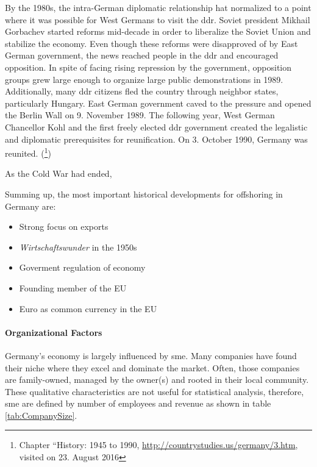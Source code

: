 By the 1980s, the intra-German diplomatic relationship hat normalized to a point where it was possible for West Germans to visit the \gls{ddr}. Soviet president Mikhail Gorbachev started reforms  mid-decade in order to liberalize the Soviet Union and stabilize the economy. Even though these reforms were disapproved of by East German government, the news reached people in the \gls{ddr} and encouraged opposition. In spite of facing rising repression by the government, opposition groups grew large enough to organize large public demonstrations in 1989. Additionally, many \gls{ddr} citizens fled the country through neighbor states, particularly Hungary. East German government caved to the pressure and opened the Berlin Wall on 9. November 1989. The following year, West German Chancellor Kohl and the first freely elected \gls{ddr} government created the legalistic and diplomatic prerequisites for reunification. On 3. October 1990, Germany was reunited.
(\cite{Solsten.1995}\footnote{Chapter ``History: 1945 to 1990, \url{http://countrystudies.us/germany/3.htm}, visited on 23. August 2016})

As the Cold War had ended, 

Summing up, the most important historical developments for offshoring in Germany are:
\begin{itemize}
	\item Strong focus on exports
	\item \textit{Wirtschaftswunder} in the 1950s
	\item Goverment regulation of economy
	\item Founding member of the EU
	\item Euro as common currency in the EU
\end{itemize}


\paragraph{Organizational Factors}
Germany's economy is largely influenced by \gls{sme}. Many companies have found their niche where they excel and dominate the market. Often, those companies are family-owned, managed by the owner(s) and rooted in their local community. These qualitative characteristics are not useful for statistical analysis, therefore, \gls{sme} are defined by number of employees and revenue as shown in table \ref{tab:CompanySize}.

